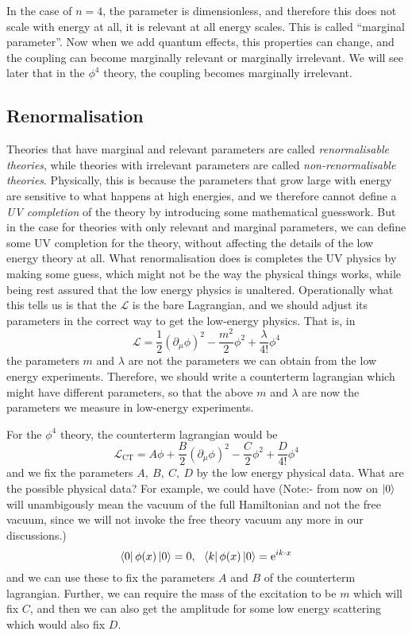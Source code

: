 \documentclass[11pt, notitlepage]{report}
\newcommand{\del}{\partial}
\newcommand{\e}{\mathrm{e}}
\newcommand{\ld}{\mathcal{L}}
\numberwithin{equation}{section}
\begin{document}
In the case of \(n=4\), the parameter is dimensionless, and therefore this does not scale with energy at all, it is relevant at all energy scales. This is called ``marginal parameter''. Now when we add quantum effects, this properties can change, and the coupling can become marginally relevant or marginally irrelevant. We will see later that in the \(\phi^4\) theory, the coupling becomes marginally irrelevant.

\subsection{Renormalisation}

Theories that have marginal and relevant parameters are called \textit{renormalisable theories}, while theories with irrelevant parameters are called \textit{non-renormalisable theories}. Physically, this is because the parameters that grow large with energy are sensitive to what happens at high energies, and we therefore cannot define a \textit{UV completion} of the theory by introducing some mathematical guesswork. But in the case for theories with only relevant and marginal parameters, we can define some UV completion for the theory, without affecting the details of the low energy theory at all. What renormalisation does is completes the UV physics by  making some guess, which might not be the way the physical things works, while being rest assured that the low energy physics is unaltered.
Operationally what this tells us is that the \(\ld\) is the bare Lagrangian, and we should adjust its parameters in the correct way to get the low-energy physics. That is, in 
\begin{equation*}
    \ld = \frac{1}{2}(\del_\mu \phi)^2 - \frac{m^2}{2}\phi^2 + \frac{\lambda}{4!}\phi^4
\end{equation*}
the parameters \(m\) and \(\lambda\) are not the parameters we can obtain from the low energy experiments. Therefore, we should write a counterterm lagrangian which might have different parameters, so that the above \(m\) and \(\lambda\) are now the parameters we measure in low-energy experiments. 

For the \(\phi^4\) theory, the counterterm lagrangian would be 
\begin{equation*}
    \ld_{\text{CT}} = A\phi + \frac{B}{2}(\del_\mu \phi)^2 - \frac{C}{2}\phi^2  + \frac{D}{4!}\phi^4
\end{equation*}
and we fix the parameters \(A,~B,~C,~D\) by the low energy physical data. What are the possible physical data? For example, we could have (Note:- from now on \(\ket{0}\) will unambigously mean the vacuum of the full Hamiltonian and not the free vacuum, since we will not invoke the free theory vacuum any more in our discussions.)
\begin{equation*}
    \bra{0}\phi(x)\ket{0} = 0,~~\bra{k}\phi(x)\ket{0} = \e^{ik\cdot x}
\end{equation*}
and we can use these to fix the parameters \(A\) and \(B\) of the counterterm lagrangian. Further, we can require the mass of the excitation to be \(m\) which will fix \(C\), and then we can also get the amplitude for some low energy scattering which would also fix \(D\).\\
\end{document}
